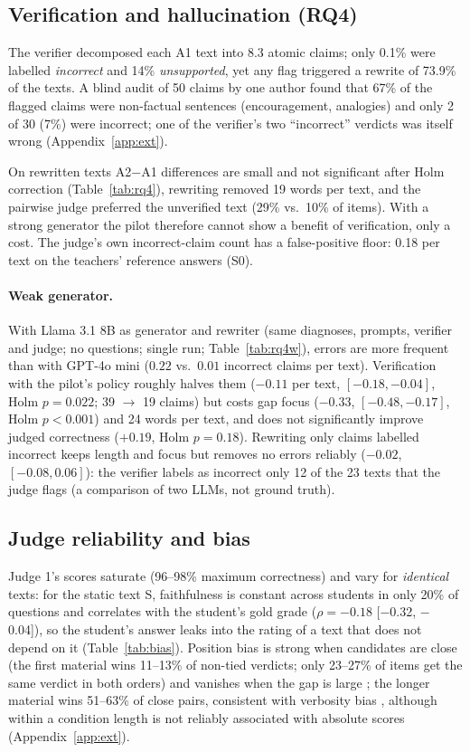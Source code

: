 \documentclass[11pt]{article}
\begin{document}
\subsection{Verification and hallucination (RQ4)}
The verifier decomposed each A1 text into 8.3 atomic claims; only 0.1\% were labelled \emph{incorrect} and 14\% \emph{unsupported}, yet any flag triggered a rewrite of 73.9\% of the texts. A blind audit of 50 claims by one author found that 67\% of the flagged claims were non-factual sentences (encouragement, analogies) and only 2 of 30 (7\%) were incorrect; one of the verifier's two ``incorrect'' verdicts was itself wrong (Appendix~\ref{app:ext}).

On rewritten texts A2$-$A1 differences are small and not significant after Holm correction (Table~\ref{tab:rq4}), rewriting removed 19 words per text, and the pairwise judge preferred the unverified text (29\% vs.\ 10\% of items). With a strong generator the pilot therefore cannot show a benefit of verification, only a cost. The judge's own incorrect-claim count has a false-positive floor: 0.18 per text on the teachers' reference answers (S0).

\paragraph{Weak generator.} With Llama 3.1 8B as generator and rewriter (same diagnoses, prompts, verifier and judge; no questions; single run; Table~\ref{tab:rq4w}), errors are more frequent than with GPT-4o mini ($0.22$ vs.\ $0.01$ incorrect claims per text). Verification with the pilot's policy roughly halves them ($-0.11$ per text, $[-0.18, -0.04]$, Holm $p{=}0.022$; 39 $\to$ 19 claims) but costs gap focus ($-0.33$, $[-0.48, -0.17]$, Holm $p{<}0.001$) and 24 words per text, and does not significantly improve judged correctness ($+0.19$, Holm $p{=}0.18$). Rewriting only claims labelled incorrect keeps length and focus but removes no errors reliably ($-0.02$, $[-0.08, 0.06]$): the verifier labels as incorrect only 12 of the 23 texts that the judge flags (a comparison of two LLMs, not ground truth).

\subsection{Judge reliability and bias}
Judge 1's scores saturate (96--98\% maximum correctness) and vary for \emph{identical} texts: for the static text S, faithfulness is constant across students in only 20\% of questions and correlates with the student's gold grade ($\rho=-0.18$ [$-$0.32, $-$0.04]), so the student's answer leaks into the rating of a text that does not depend on it (Table~\ref{tab:bias}). Position bias is strong when candidates are close (the first material wins 11--13\% of non-tied verdicts; only 23--27\% of items get the same verdict in both orders) and vanishes when the gap is large \citep{shi2025}; the longer material wins 51--63\% of close pairs, consistent with verbosity bias \citep{zheng2023}, although within a condition length is not reliably associated with absolute scores (Appendix~\ref{app:ext}).
\end{document}
